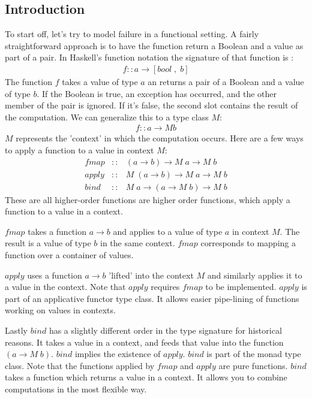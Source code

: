 \documentclass[12pt,fleqn]{article}
\begin{document}
\subsection{Introduction}
%
%
To start off, let's try to model failure in a functional setting.
A fairly straightforward approach is to have the function return a Boolean and a value as part of a pair.
In Haskell's function notation the signature of that function is :
\begin{eqnarray*}
f :: a \rightarrow [ bool \;,\; b ]
\end{eqnarray*}
The function $f$ takes a value of type $a$ an returns a pair of a Boolean and a value of type $b$.
If the Boolean is true, an exception has occurred, and the other member of the pair is ignored.
If it's false, the second slot contains the result of the computation.
We can generalize this to a type class $M$:
\begin{eqnarray*}
f :: a \rightarrow M b
\end{eqnarray*}
$M$ represents the 'context' in which the computation occurs.
Here are a few ways to apply a function to a value in context $M$:
\begin{eqnarray*}
fmap  &::& (a \rightarrow b) \rightarrow M\;a \rightarrow M \;b \\
apply &::& M \; (a \rightarrow b) \rightarrow M\;a \rightarrow M \;b \\
bind  &::& M \; a \rightarrow (a \rightarrow M\; b) \rightarrow M \; b
\end{eqnarray*}
These are all higher-order functions are higher order functions, which apply a function to a value in a context.

$fmap$ takes a function $a \rightarrow b$ and applies to a value of type $a$ in context $M$. 
The result is a value of type $b$ in the same context.
$fmap$ corresponds to mapping a function over a container of values.

$apply$ uses a function $a \rightarrow b$ 'lifted' into the context $M$ and similarly applies it to a value in the context.
Note that $apply$ requires $fmap$ to be implemented.
$apply$ is part of an applicative functor type class.
It allows easier pipe-lining of functions working on values in contexts.

Lastly $bind$ has a slightly different order in the type signature for historical reasons. 
It takes a value in a context, and feeds that value into the function $(a \rightarrow M\; b)$.
$bind$ implies the existence of $apply$.
$bind$ is part of the monad type class. 
Note that the functions applied by $fmap$ and $apply$ are pure functions. $bind$ takes a function which returns a value in a context.
It allows you to combine computations in the most flexible way.
\end{document}
